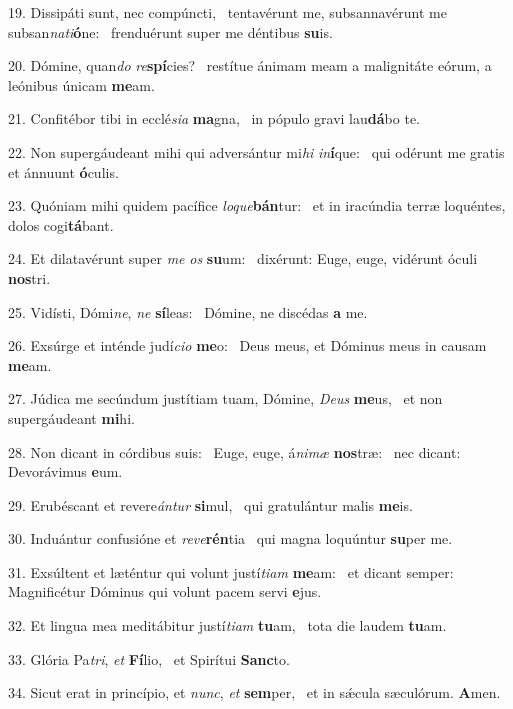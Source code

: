 19. Dissipáti sunt, nec compúncti, \dag\  tentavérunt me, subsannavérunt me subsan\textit{na}\textit{ti}\textbf{ó}ne: \ast\  frenduérunt super me déntibus \textbf{su}is.\

20. Dómine, quan\textit{do} \textit{re}\textbf{spí}cies? \ast\  restítue ánimam meam a malignitáte eórum, a leónibus únicam \textbf{me}am.\

21. Confitébor tibi in ecclé\textit{si}\textit{a} \textbf{ma}gna, \ast\  in pópulo gravi lau\textbf{dá}bo te.\

22. Non supergáudeant mihi qui adversántur mi\textit{hi} \textit{in}\textbf{í}que: \ast\  qui odérunt me gratis et ánnuunt \textbf{ó}culis.\

23. Quóniam mihi quidem pacífice \textit{lo}\textit{que}\textbf{bán}tur: \ast\  et in iracúndia terræ loquéntes, dolos cogi\textbf{tá}bant.\

24. Et dilatavérunt super \textit{me} \textit{os} \textbf{su}um: \ast\  dixérunt: Euge, euge, vidérunt óculi \textbf{nos}tri.\

25. Vidísti, Dómi\textit{ne}, \textit{ne} \textbf{sí}leas: \ast\  Dómine, ne discédas \textbf{a} me.\

26. Exsúrge et inténde judí\textit{ci}\textit{o} \textbf{me}o: \ast\  Deus meus, et Dóminus meus in causam \textbf{me}am.\

27. Júdica me secúndum justítiam tuam, Dómine, \textit{De}\textit{us} \textbf{me}us, \ast\  et non supergáudeant \textbf{mi}hi.\

28. Non dicant in córdibus suis: \dag\  Euge, euge, á\textit{ni}\textit{mæ} \textbf{nos}træ: \ast\  nec dicant: Devorávimus \textbf{e}um.\

29. Erubéscant et revere\textit{án}\textit{tur} \textbf{si}mul, \ast\  qui gratulántur malis \textbf{me}is.\

30. Induántur confusióne et \textit{re}\textit{ve}\textbf{rén}tia \ast\  qui magna loquúntur \textbf{su}per me.\

31. Exsúltent et læténtur qui volunt justí\textit{ti}\textit{am} \textbf{me}am: \ast\  et dicant semper: Magnificétur Dóminus qui volunt pacem servi \textbf{e}jus.\

32. Et lingua mea meditábitur justí\textit{ti}\textit{am} \textbf{tu}am, \ast\  tota die laudem \textbf{tu}am.\

33. Glória Pa\textit{tri}, \textit{et} \textbf{Fí}lio, \ast\  et Spirítui \textbf{Sanc}to.\

34. Sicut erat in princípio, et \textit{nunc}, \textit{et} \textbf{sem}per, \ast\  et in sǽcula sæculórum. \textbf{A}men.\

